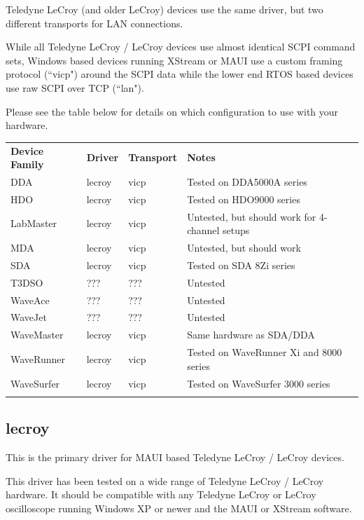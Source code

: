 Teledyne LeCroy (and older LeCroy) devices use the same driver, but two different transports for LAN connections.

While all Teledyne LeCroy / LeCroy devices use almost identical SCPI command sets, Windows based devices running
XStream or MAUI use a custom framing protocol (``vicp") around the SCPI data while the lower end RTOS based devices use
raw SCPI over TCP (``lan").

Please see the table below for details on which configuration to use with  your hardware.

\begin{tabularx}{16cm}{lllX}
\thickhline
\textbf{Device Family} & \textbf{Driver} & \textbf{Transport} & \textbf{Notes} \\
\thickhline
DDA & lecroy & vicp & Tested on DDA5000A series \\
\thickhline
HDO & lecroy & vicp & Tested on HDO9000 series \\
\thickhline
LabMaster & lecroy & vicp & Untested, but should work for 4-channel setups\\
\thickhline
MDA & lecroy & vicp & Untested, but should work\\
\thickhline
SDA & lecroy & vicp & Tested on SDA 8Zi series\\
\thickhline
T3DSO & ??? & ??? & Untested\\
\thickhline
WaveAce & ??? & ??? & Untested\\
\thickhline
WaveJet & ??? & ??? & Untested\\
\thickhline
WaveMaster & lecroy & vicp & Same hardware as SDA/DDA\\
\thickhline
WaveRunner & lecroy & vicp & Tested on WaveRunner Xi and 8000 series\\
\thickhline
WaveSurfer & lecroy & vicp & Tested on WaveSurfer 3000 series \\
\thickhline
\end{tabularx}

\subsection{lecroy}

This is the primary driver for MAUI based Teledyne LeCroy / LeCroy devices.

This driver has been tested on a wide range of Teledyne LeCroy / LeCroy hardware. It should be compatible with any
Teledyne LeCroy or LeCroy oscilloscope running Windows XP or newer and the MAUI or XStream software.

